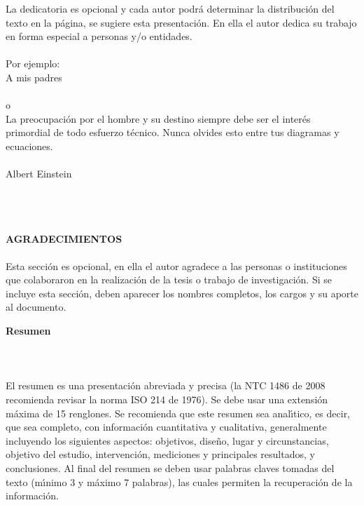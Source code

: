 \begin{flushright}
\begin{minipage}{8cm}
    \noindent
        \small
        La dedicatoria es opcional y cada autor podr\'a determinar la distribuci\'on del texto en la p\'{a}gina, se sugiere esta presentaci\'on. En ella el autor dedica su trabajo en forma especial a personas y/o entidades.\\[1.0cm]\\
        Por ejemplo:\\[1.0cm]
        A mis padres\\[1.0cm]\\
        o\\[1.0cm]
        La preocupaci\'on por el hombre y su destino siempre debe ser el
        inter\'es primordial de todo esfuerzo t\'ecnico. Nunca olvides esto
        entre tus diagramas y ecuaciones.\\\\
        Albert Einstein\\
\end{minipage}
\end{flushright}


\newpage
\thispagestyle{empty} \textbf{}\normalsize
\\\\\\%
\textbf{AGRADECIMIENTOS}
\\\\
Esta secci\'{o}n es opcional, en ella el autor agradece a las personas o instituciones que colaboraron en la realizaci\'{o}n de la tesis  o trabajo de investigaci\'{o}n. Si se incluye esta secci\'{o}n, deben aparecer los nombres completos, los cargos y su aporte al documento.\\

\newpage{\pagestyle{empty}\cleardoublepage}

\newpage
\textbf{\LARGE Resumen}\\\\
\\\\
El resumen es una presentaci\'{o}n abreviada y precisa (la NTC 1486 de 2008 recomienda revisar la norma ISO 214 de 1976). Se debe usar una extensi\'{o}n m\'{a}xima de 15 renglones. Se recomienda que este resumen sea anal\'{\i}tico, es decir, que sea completo, con informaci\'{o}n cuantitativa y cualitativa, generalmente incluyendo los siguientes aspectos: objetivos, dise\~{n}o, lugar y circunstancias, objetivo del estudio, intervenci\'{o}n, mediciones y principales resultados, y conclusiones. Al final del resumen se deben usar palabras claves tomadas del texto (m\'{\i}nimo 3 y m\'{a}ximo 7 palabras), las cuales permiten la recuperaci\'{o}n de la informaci\'{o}n.\\

